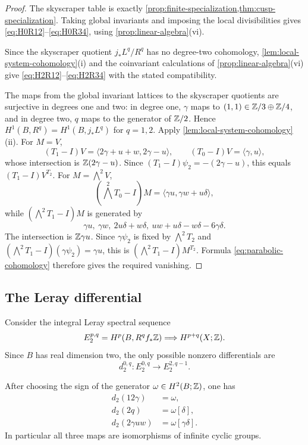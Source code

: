 \begin{proof}
The skyscraper table is exactly
\cref{prop:finite-specialization,thm:cusp-specialization}.  Taking global
invariants and imposing the local divisibilities gives
\eqref{eq:H0R12}--\eqref{eq:H0R34}, using
\cref{prop:linear-algebra}(vi).

Since the skyscraper quotient $j_*L^q/R^q$ has no degree-two
cohomology, \cref{lem:local-system-cohomology}(i) and the coinvariant
calculations of \cref{prop:linear-algebra}(vi) give
\eqref{eq:H2R12}--\eqref{eq:H2R34} with the stated compatibility.

The maps from the global invariant lattices to the skyscraper quotients
are surjective in degrees one and two: in degree one, $\gamma$ maps to
$(1,1)\in\mathbb Z/3\oplus\mathbb Z/4$, and in degree two, $q$ maps to the generator of
$\mathbb Z/2$.  Hence $H^1(B,R^q)=H^1(B,j_*L^q)$ for $q=1,2$.  Apply
\cref{lem:local-system-cohomology}(ii).  For $M=V$,
\[
 (T_1-I)V=\langle2\gamma+u+w,2\gamma-u\rangle,
 \qquad
 (T_0-I)V=\langle\gamma,u\rangle,
\]
whose intersection is $\mathbb Z(2\gamma-u)$.  Since
$(T_1-I)\psi_2=-(2\gamma-u)$, this equals $(T_1-I)V^{T_2}$.  For
$M=\bigwedge^2V$,
\[
 (\textstyle\bigwedge^2T_0-I)M
 =\langle\gamma u,\gamma w+u\delta\rangle,
\]
while $(\bigwedge^2T_1-I)M$ is generated by
\[
 \gamma u,\ \gamma w,\ 2u\delta+w\delta,
 \ uw+u\delta-w\delta-6\gamma\delta.
\]
The intersection is $\mathbb Z\gamma u$.  Since $\gamma\psi_2$ is fixed by
$\bigwedge^2T_2$ and
$(\bigwedge^2T_1-I)(\gamma\psi_2)=\gamma u$, this is
$(\bigwedge^2T_1-I)M^{T_2}$.  Formula
\eqref{eq:parabolic-cohomology} therefore gives the required vanishing.
\end{proof}

\subsection{The Leray differential}
Consider the integral Leray spectral sequence
\[
 E_2^{p,q}=H^p(B,R^qf_*\mathbb Z)\Longrightarrow H^{p+q}(X;\mathbb Z).
\]
Since $B$ has real dimension two, the only possible nonzero differentials
are
\[
 d_2^{0,q}:E_2^{0,q}\longrightarrow E_2^{2,q-1}.
\]

\begin{proposition}\label{prop:leray-differentials}
After choosing the sign of the generator
$\omega\in H^2(B;\mathbb Z)$, one has
\begin{align}
 d_2(12\gamma)&=\omega,
 \label{eq:d2-gamma}\\
 d_2(2q)&=\omega[\delta],
 \label{eq:d2-q}\\
 d_2(2\gamma uw)&=\omega[\gamma\delta].
 \label{eq:d2-gamma-uw}
\end{align}
In particular all three maps are isomorphisms of infinite cyclic groups.
\end{proposition}

